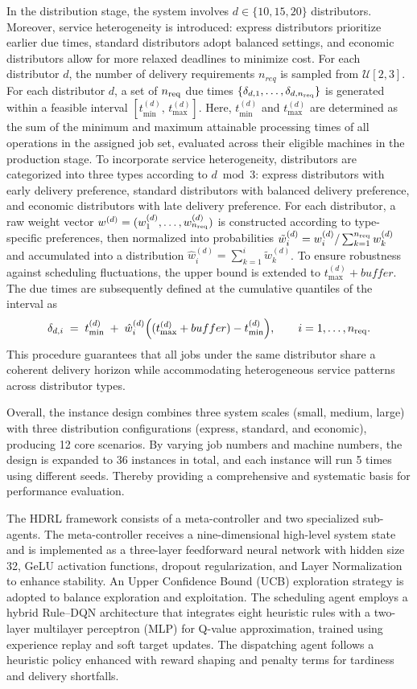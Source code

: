\documentclass{article}
\begin{document}
In the distribution stage, the system involves $d \in \{10, 15, 20\}$ distributors. Moreover, service heterogeneity is introduced: express distributors prioritize earlier due times, standard distributors adopt balanced settings, and economic distributors allow for more relaxed deadlines to minimize cost. For each distributor $d$, the number of delivery requirements $n_{req}$ is sampled from $\mathcal{U}[2,3]$.
For each distributor $d$, a set of $n_{\rm req}$ due times $\{\delta_{d,1},\ldots,\delta_{d,n_{\rm req}}\}$ is generated within a feasible interval $[t_{\min}^{(d)},\,t_{\max}^{(d)}]$. Here, $t_{\min}^{(d)}$ and $t_{\max}^{(d)}$ are determined as the sum of the minimum and maximum attainable processing times of all operations in the assigned job set, evaluated across their eligible machines in the production stage. To incorporate service heterogeneity, distributors are categorized into three types according to $d \bmod 3$: express distributors with early delivery preference, standard distributors with balanced delivery preference, and economic distributors with late delivery preference. For each distributor, a raw weight vector $w^{(d)}=(w^{(d)}_1,\ldots,w^{(d)}_{n_{\rm req}})$ is constructed according to type-specific preferences, then normalized into probabilities $\tilde w^{(d)}_i=w^{(d)}_i/\sum_{k=1}^{n_{\rm req}} w^{(d)}_k$ and accumulated into a distribution $\hat w^{(d)}_i=\sum_{k=1}^i \tilde w^{(d)}_k$. To ensure robustness against scheduling fluctuations, the upper bound is extended to $t_{\max}^{(d)}+buffer$. The due times are subsequently defined at the cumulative quantiles of the interval as
\[
\delta_{d,i} \;=\; t_{\min}^{(d)} \;+\; \hat w^{(d)}_i \Bigl( (t_{\max}^{(d)}+buffer) - t_{\min}^{(d)} \Bigr), \qquad i=1,\ldots,n_{\rm req}.
\]
This procedure guarantees that all jobs under the same distributor share a coherent delivery horizon while accommodating heterogeneous service patterns across distributor types.


Overall, the instance design combines three system scales (small, medium, large) with three distribution configurations (express, standard, and economic), producing 12 core scenarios. By varying job numbers and machine numbers, the design is expanded to 36 instances in total, and each instance will run 5 times using different seeds. Thereby providing a comprehensive and systematic basis for performance evaluation.

The HDRL framework consists of a meta-controller and two specialized sub-agents. The meta-controller receives a nine-dimensional high-level system state and is implemented as a three-layer feedforward neural network with hidden size 32, GeLU activation functions, dropout regularization, and Layer Normalization to enhance stability. An Upper Confidence Bound (UCB) exploration strategy is adopted to balance exploration and exploitation. The scheduling agent employs a hybrid Rule–DQN architecture that integrates eight heuristic rules with a two-layer multilayer perceptron (MLP) for Q-value approximation, trained using experience replay and soft target updates. The dispatching agent follows a heuristic policy enhanced with reward shaping and penalty terms for tardiness and delivery shortfalls.
\end{document}
